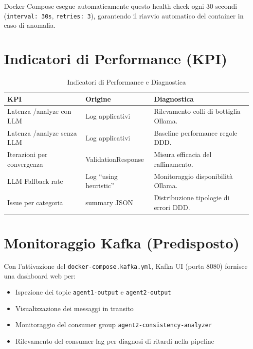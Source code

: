 \documentclass[12pt,a4paper]{report}
\begin{document}
Docker Compose esegue automaticamente questo health check ogni 30 secondi
(\texttt{interval: 30s}, \texttt{retries: 3}), garantendo il riavvio
automatico del container in caso di anomalia.
\section{Indicatori di Performance (KPI)}

\begin{table}[H]
\centering
\renewcommand{\arraystretch}{1.3}
\begin{tabularx}{\textwidth}{l l X}
\toprule
\textbf{KPI} & \textbf{Origine} & \textbf{Diagnostica} \\
\midrule
Latenza /analyze con LLM    & Log applicativi & Rilevamento colli di bottiglia Ollama. \\
Latenza /analyze senza LLM  & Log applicativi & Baseline performance regole DDD. \\
Iterazioni per convergenza  & ValidationResponse & Misura efficacia del raffinamento. \\
LLM Fallback rate           & Log ``using heuristic'' & Monitoraggio disponibilità Ollama. \\
Issue per categoria         & summary JSON & Distribuzione tipologie di errori DDD. \\
\bottomrule
\end{tabularx}
\caption{Indicatori di Performance e Diagnostica}
\label{tab:kpi}
\end{table}

\section{Monitoraggio Kafka (Predisposto)}

Con l'attivazione del \texttt{docker-compose.kafka.yml}, Kafka UI
(porta 8080) fornisce una dashboard web per:
\begin{itemize}
  \item Ispezione dei topic \texttt{agent1-output} e \texttt{agent2-output}
  \item Visualizzazione dei messaggi in transito
  \item Monitoraggio del consumer group \texttt{agent2-consistency-analyzer}
  \item Rilevamento del consumer lag per diagnosi di ritardi nella pipeline
\end{itemize}

\end{document}
